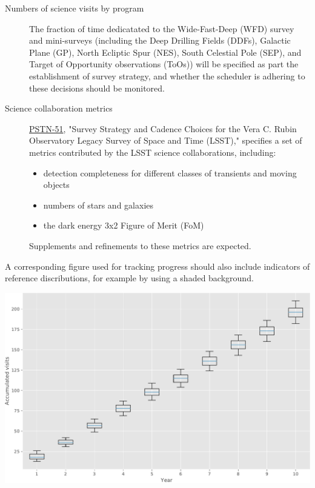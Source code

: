 \begin{description}
\item[{Numbers of science visits by program}] The fraction of time dedicatated to the Wide-Fast-Deep (WFD) survey and mini-surveys (including the Deep Drilling Fields (DDFs), Galactic Plane (GP), North Ecliptic Spur (NES), South Celestial Pole (SEP), and Target of Opportunity observations (ToOs)) will be specified as part the establishment of survey strategy, and whether the scheduler is adhering to these decisions should be monitored.
\item[{Science collaboration metrics}] \href{https://ls.st/pstn-051}{PSTN-51}, "Survey Strategy and Cadence Choices for the Vera C. Rubin Observatory Legacy Survey of Space and Time (LSST)," specifies a set of metrics contributed by the LSST science collaborations, including:
\begin{itemize}
\item detection completeness for different classes of transients and moving objects
\item numbers of stars and galaxies
\item the dark energy 3x2 Figure of Merit (FoM)
\end{itemize}
Supplements and refinements to these metrics are expected.
\end{description}

A corresponding figure used for tracking progress should also include indicators of reference discributions, for example by using a shaded background.
\begin{center}
\includegraphics[width=.9\linewidth]{./figures/numvisits_boxplot.pdf}
\label{org7b0ba10}
\end{center}

